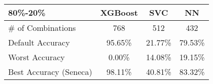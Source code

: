 \begin{tabular}{|l|c|c|c|}
\hline
\textbf{80\%-20\%} & \textbf{XGBoost} & \textbf{SVC} & \textbf{NN}\\
\hline
\# of Combinations & 768 & 512 & 432 \\
\hline
\hline
Default Accuracy & 95.65\% & 21.77\% & 79.53\%\\
\hline
Worst Accuracy&0.00\%&14.08\% & 19.15\%\\
\hline
Best Accuracy (Seneca) &98.11\% & 40.81\% & 83.32\%\\
\hline



\end{tabular}
